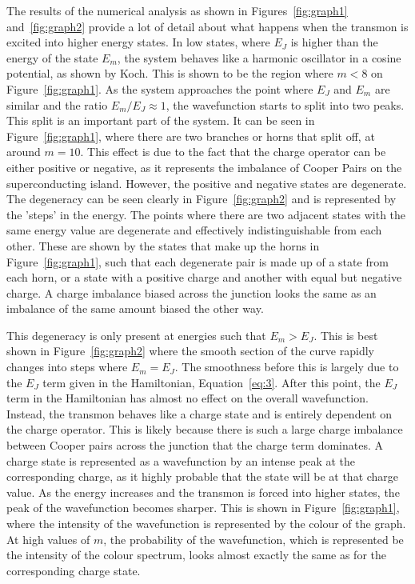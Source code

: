 \documentclass[11pt]{article}
\begin{document}
The results of the numerical analysis as shown in Figures~\ref{fig:graph1} and~\ref{fig:graph2} provide a lot of detail about what happens when the transmon is excited into higher energy states. In low states, where $E_J$ is higher than the energy of the state $E_m$, the system behaves like a harmonic oscillator in a cosine potential, as shown by Koch. This is shown to be the region where $m<8$ on Figure~\ref{fig:graph1}. As the system approaches the point where $E_J$ and $E_m$ are similar and the ratio $E_m/E_J \approx 1$, the wavefunction starts to split into two peaks. This split is an important part of the system. It can be seen in Figure~\ref{fig:graph1}, where there are two branches or horns that split off, at around $m=10$. This effect is due to the fact that the charge operator can be either positive or negative, as it represents the imbalance of Cooper Pairs on the superconducting island. However, the positive and negative states are degenerate. The degeneracy can be seen clearly in Figure~\ref{fig:graph2} and is represented by the 'steps' in the energy. The points where there are two adjacent states with the same energy value are degenerate and effectively indistinguishable from each other. These are shown by the states that make up the horns in Figure~\ref{fig:graph1}, such that each degenerate pair is made up of a state from each horn, or a state with a positive charge and another with equal but negative charge. A charge imbalance biased across the junction looks the same as an imbalance of the same amount biased the other way.

This degeneracy is only present at energies such that $E_m > E_J$. This is best shown in Figure~\ref{fig:graph2} where the smooth section of the curve rapidly changes into steps where $E_m = E_J$. The smoothness before this is largely due to the $E_J$ term given in the Hamiltonian, Equation~\ref{eq:3}. After this point, the $E_J$ term in the Hamiltonian has almost no effect on the overall wavefunction. Instead, the transmon behaves like a charge state and is entirely dependent on the charge operator. This is likely because there is such a large charge imbalance between Cooper pairs across the junction that the charge term dominates. A charge state is represented as a wavefunction by an intense peak at the corresponding charge, as it highly probable that the state will be at that charge value. As the energy increases and the transmon is forced into higher states, the peak of the wavefunction becomes sharper. This is shown in Figure~\ref{fig:graph1}, where the intensity of the wavefunction is represented by the colour of the graph. At high values of $m$, the probability of the wavefunction, which is represented be the intensity of the colour spectrum,  looks almost exactly the same as for the corresponding charge state.
\end{document}
